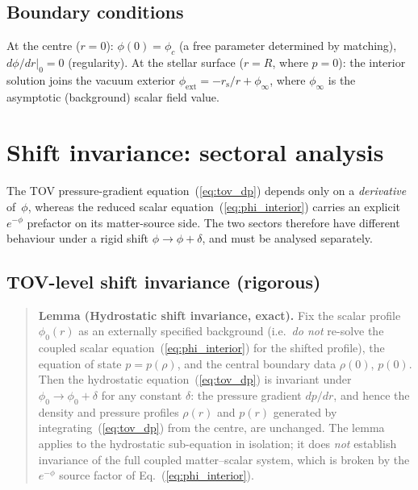 \documentclass[11pt]{article}
\newcommand{\rs}{r_{\mathrm{s}}}
\begin{document}
\subsection{Boundary conditions}

At the centre ($r = 0$): $\phi(0) = \phi_c$ (a free
parameter determined by matching), $d\phi/dr|_0 = 0$
(regularity).  At the stellar surface ($r = R$, where
$p = 0$): the interior solution joins the vacuum exterior
$\phi_{\mathrm{ext}} = -\rs/r + \phi_\infty$, where
$\phi_\infty$ is the asymptotic (background) scalar field
value.

\section{Shift invariance: sectoral analysis}
\label{sec:shift}

The TOV pressure-gradient
equation~(\ref{eq:tov_dp}) depends only on a
\emph{derivative} of~$\phi$, whereas the reduced scalar
equation~(\ref{eq:phi_interior}) carries an explicit
$e^{-\phi}$ prefactor on its matter-source side.  The two
sectors therefore have different behaviour under a rigid
shift $\phi\to\phi+\delta$, and must be analysed
separately.

\subsection{TOV-level shift invariance (rigorous)}
\label{sec:shift_tov}

\begin{quote}
\textbf{Lemma (Hydrostatic shift invariance, exact).}
Fix the scalar profile $\phi_0(r)$ as an externally
specified background (i.e.\ \emph{do not} re-solve the
coupled scalar equation~(\ref{eq:phi_interior}) for the
shifted profile), the equation of state $p=p(\rho)$, and
the central boundary data $\rho(0)$, $p(0)$.  Then the
hydrostatic equation~(\ref{eq:tov_dp}) is invariant
under $\phi_0 \to \phi_0 + \delta$ for any constant
$\delta$: the pressure gradient $dp/dr$, and hence
the density and pressure profiles $\rho(r)$ and $p(r)$
generated by integrating~(\ref{eq:tov_dp}) from the
centre, are unchanged.  The lemma applies to the
hydrostatic sub-equation in isolation; it does
\emph{not} establish invariance of the full coupled
matter--scalar system, which is broken by the
$e^{-\phi}$ source factor of
Eq.~(\ref{eq:phi_interior}).
\end{quote}
\end{document}
